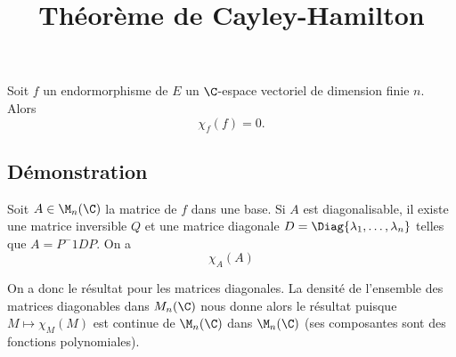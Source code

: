 \documentclass[fontsize=12pt,twoside=false,parskip=half, french]{scrartcl}
\title{Théorème de Cayley-Hamilton}
\date{}
\author{}
\begin{document}
\maketitle
   \begin{Theoreme}
      Soit $f$ un endormorphisme de $E$ un $\C$-espace vectoriel de dimension finie $n$. Alors
      \[
         \chi_f(f) = 0.
      \]
   \end{Theoreme}
   \subsection{Démonstration}
      Soit $A \in \M_n(\C)$ la matrice de $f$ dans une base. Si $A$ est diagonalisable, il existe une matrice inversible $Q$ et une matrice diagonale $D = \Diag{\lambda_1, \ldots, \lambda_n}$ telles que $A = P^-1DP$. On a 
      \[  
         \chi_A(A)
      \]
      
      On a donc le résultat pour les matrices diagonales. La densité de l'ensemble des matrices diagonables dans $M_n(\C)$ nous donne alors le résultat puisque $M \mapsto \chi_M(M)$ est continue de $\M_n(\C)$ dans $\M_n(\C)$ (ses composantes sont des fonctions polynomiales).
\end{document}
